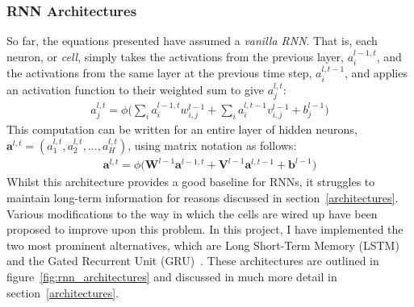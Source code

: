 \documentclass[a4paper, 12pt]{report}
\newcommand{\tit}[1]{\textit{#1}}
\begin{document}
\subsubsection{RNN Architectures}
So far, the equations presented have assumed a \tit{vanilla RNN}. That is, each neuron, or \tit{cell}, simply takes the activations from the previous layer, $a_i^{l - 1, t}$, and the activations from the same layer at the previous time step, $a_i^{l, t - 1}$, and applies an activation function to their weighted sum to give $a_j^{l, t}$:
\begin{gather}
	a_j^{l, t} = \phi \big( \sum_i a_i^{l - 1, t} w_{i,j}^{l-1} + \sum_i a_i^{l, t - 1} v_{i,j}^{l-1} + b^{l - 1}_j \big)
\end{gather}
This computation can be written for an entire layer of hidden neurons, $\mathbf{a}^{l, t} = (a_1^{l, t}, a_2^{l, t}, ..., a_H^{l, t})$, using matrix notation as follows:
\begin{gather} \label{eq:vanilla_rnn}
	\mathbf{a}^{l, t} = \phi \big( \mathbf{W}^{l - 1} \mathbf{a}^{l - 1, t} + \mathbf{V}^{l - 1} \mathbf{a}^{l, t - 1} + \mathbf{b}^{l - 1} \big)
\end{gather}
Whilst this architecture provides a good baseline for RNNs, it struggles to maintain long-term information for reasons discussed in section~\ref{architectures}. Various modifications to the way in which the cells are wired up have been proposed to improve upon this problem. In this project, I have implemented the two most prominent alternatives, which are Long Short-Term Memory (LSTM)~\cite{lstm:hochreiter1997} and the Gated Recurrent Unit (GRU)~\cite{gru:cho2014}. These architectures are outlined in figure~\ref{fig:rnn_architectures} and discussed in much more detail in section~\ref{architectures}. \\
\end{document}
